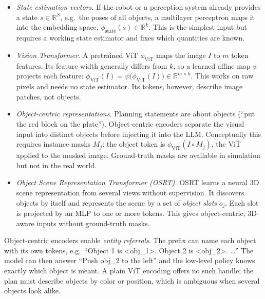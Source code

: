 \begin{itemize}
  \item \emph{State estimation vectors.} If the robot or a perception system
    already provides a state $s\in\mathbb R^S$, e.g.\ the poses of all objects,
    a multilayer perceptron maps it into the embedding space,
    $\phi_{\mathrm{state}}(s)\in\mathbb R^{k}$. This is the simplest input but
    requires a working state estimator and fixes which quantities are known.
  \item \emph{Vision Transformer.} A pretrained ViT
    $\tilde\phi_{\mathrm{ViT}}$ maps the image $I$ to $m$ token features. Its
    feature width generally differs from $k$, so a learned affine map $\psi$
    projects each feature:
    $\phi_{\mathrm{ViT}}(I)=\psi\bigl(\tilde\phi_{\mathrm{ViT}}(I)\bigr)
    \in\mathbb R^{m\times k}$. This works on raw pixels and needs no state
    estimator. Its tokens, however, describe image patches, not objects.
  \item \emph{Object-centric representations.} Planning statements are about
    objects (``put the red block on the plate''). Object-centric encoders
    separate the visual input into distinct objects before injecting it into
    the LLM. Conceptually this requires instance masks $M_j$: the object token
    is $\phi_{\mathrm{ViT}}(I\circ M_j)$, the ViT applied to the masked image.
    Ground-truth masks are available in simulation but not in the real world.
  \item \emph{Object Scene Representation Transformer (OSRT).} OSRT learns a
    neural 3D scene representation from several views without supervision.
    It discovers objects by itself and represents the scene by a set of
    \emph{object slots} $o_j$. Each slot is projected by an MLP to one or
    more tokens. This gives object-centric, 3D-aware inputs without
    ground-truth masks.
\end{itemize}

\noindent
Object-centric encoders enable \emph{entity referrals}. The prefix can name
each object with its own tokens, e.g.\ ``Object 1 is <obj\_1>. Object 2 is
<obj\_2>. \dots'' The model can then answer ``Push obj\_2 to the left'' and
the low-level policy knows exactly which object is meant. A plain ViT
encoding offers no such handle; the plan must describe objects by color or
position, which is ambiguous when several objects look alike.

